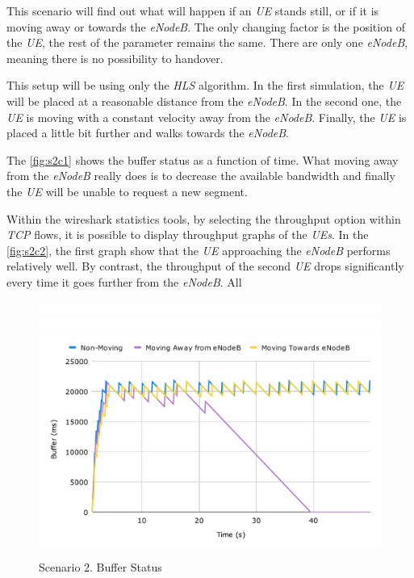 This scenario will find out what will happen if an \textit{UE} stands still, or if it is moving away
or towards the \textit{eNodeB}. The only changing factor is the position of the \textit{UE}, 
the rest of the parameter remains the same. There are only one \textit{eNodeB}, meaning there 
is no possibility to handover.

This setup will be using only the \textit{HLS} algorithm. In the first simulation, the \textit{UE}
will be placed at a reasonable distance from the \textit{eNodeB}. In the second one, the \textit{UE}
is moving with a constant velocity away from the \textit{eNodeB}. Finally, the \textit{UE} is placed 
a little bit further and walks towards the \textit{eNodeB}.


The \autoref{fig:s2c1} shows the buffer status as a function of time. What moving away from 
the \textit{eNodeB} really does is to decrease the available bandwidth and finally the \textit{UE}
will be unable to request a new segment. 

Within the wireshark statistics tools, by selecting the throughput option within \textit{TCP} flows, 
it is possible to display throughput graphs of the \textit{UEs}. In the \autoref{fig:s2c2}, the first
graph show that the \textit{UE} approaching the \textit{eNodeB} performs relatively well. By contrast,
the throughput of the second \textit{UE} drops significantly every time it goes further from the \textit{eNodeB}.
All 
\begin{figure}[h]
  \centering
  \includegraphics[width=\textwidth]{img/space.png}
  \includegraphics[width=\textwidth]{img/space.png}
  \includegraphics[width=\textwidth]{img/s2c1.pdf}
  \caption{Scenario 2. Buffer Status}
  \label{fig:s2c1}
\end{figure}



